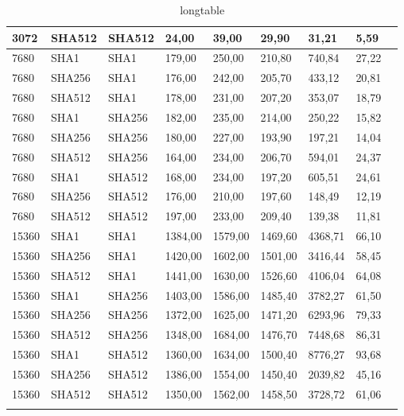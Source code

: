 \begin{longtable}{| l | l | l | l | l |l |l |l |l |}
3072 & SHA512 & SHA512 & 24,00 & 39,00 & 29,90 & 31,21 & 5,59 \\ \hline 
7680 & SHA1 & SHA1 & 179,00 & 250,00 & 210,80 & 740,84 & 27,22 \\ \hline 
7680 & SHA256 & SHA1 & 176,00 & 242,00 & 205,70 & 433,12 & 20,81 \\ \hline 
7680 & SHA512 & SHA1 & 178,00 & 231,00 & 207,20 & 353,07 & 18,79 \\ \hline 
7680 & SHA1 & SHA256 & 182,00 & 235,00 & 214,00 & 250,22 & 15,82 \\ \hline 
7680 & SHA256 & SHA256 & 180,00 & 227,00 & 193,90 & 197,21 & 14,04 \\ \hline 
7680 & SHA512 & SHA256 & 164,00 & 234,00 & 206,70 & 594,01 & 24,37 \\ \hline 
7680 & SHA1 & SHA512 & 168,00 & 234,00 & 197,20 & 605,51 & 24,61 \\ \hline 
7680 & SHA256 & SHA512 & 176,00 & 210,00 & 197,60 & 148,49 & 12,19 \\ \hline 
7680 & SHA512 & SHA512 & 197,00 & 233,00 & 209,40 & 139,38 & 11,81 \\ \hline 
15360 & SHA1 & SHA1 & 1384,00 & 1579,00 & 1469,60 & 4368,71 & 66,10 \\ \hline 
15360 & SHA256 & SHA1 & 1420,00 & 1602,00 & 1501,00 & 3416,44 & 58,45 \\ \hline 
15360 & SHA512 & SHA1 & 1441,00 & 1630,00 & 1526,60 & 4106,04 & 64,08 \\ \hline 
15360 & SHA1 & SHA256 & 1403,00 & 1586,00 & 1485,40 & 3782,27 & 61,50 \\ \hline 
15360 & SHA256 & SHA256 & 1372,00 & 1625,00 & 1471,20 & 6293,96 & 79,33 \\ \hline 
15360 & SHA512 & SHA256 & 1348,00 & 1684,00 & 1476,70 & 7448,68 & 86,31 \\ \hline 
15360 & SHA1 & SHA512 & 1360,00 & 1634,00 & 1500,40 & 8776,27 & 93,68 \\ \hline 
15360 & SHA256 & SHA512 & 1386,00 & 1554,00 & 1450,40 & 2039,82 & 45,16 \\ \hline 
15360 & SHA512 & SHA512 & 1350,00 & 1562,00 & 1458,50 & 3728,72 & 61,06 \\ \hline 
\caption{longtable}
\end{longtable}